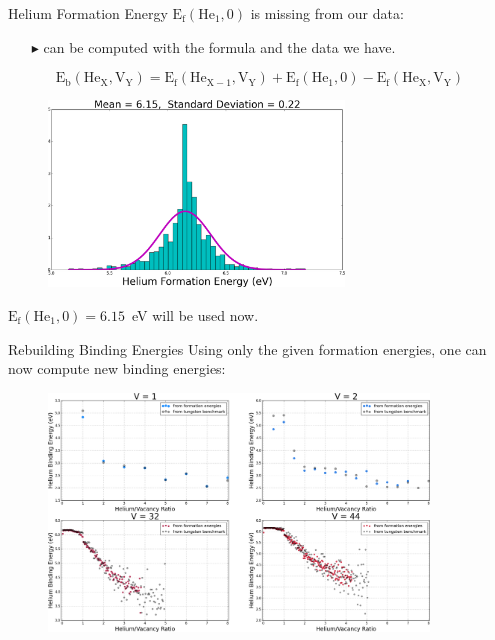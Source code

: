 \documentclass[10pt]{beamer}
\begin{document}
\begin{frame}{Helium Formation Energy}
	$\text{E}_{\text{f}}(\text{He}_1, 0)$ is missing from our data:
    \begin{itemize}
      	\item[$\blacktriangleright$] can be computed with the formula and the
      	data we have.
    \end{itemize}
	$$\text{E}_{\text{b}}(\text{He}_{\text{X}}, \text{V}_{\text{Y}}) =
	\text{E}_{\text{f}}(\text{He}_{\text{X}-1}, \text{V}_{\text{Y}}) +
	\text{E}_{\text{f}}(\text{He}_1, 0) -
	\text{E}_{\text{f}}(\text{He}_{\text{X}}, \text{V}_{\text{Y}})$$
	
    \begin{figure}
        \includegraphics[width=0.7\textwidth]{heliumFormation}
    \end{figure}
	
	$\text{E}_{\text{f}}(\text{He}_1, 0) = 6.15$~eV will be used now.
\end{frame}

\begin{frame}{Rebuilding Binding Energies}
	Using only the given formation energies, one can now compute new binding
	energies:
	
    \begin{figure}
        \includegraphics[width=0.9\textwidth]{bindingEnergiesComparison}
    \end{figure}
\end{frame}
\end{document}
